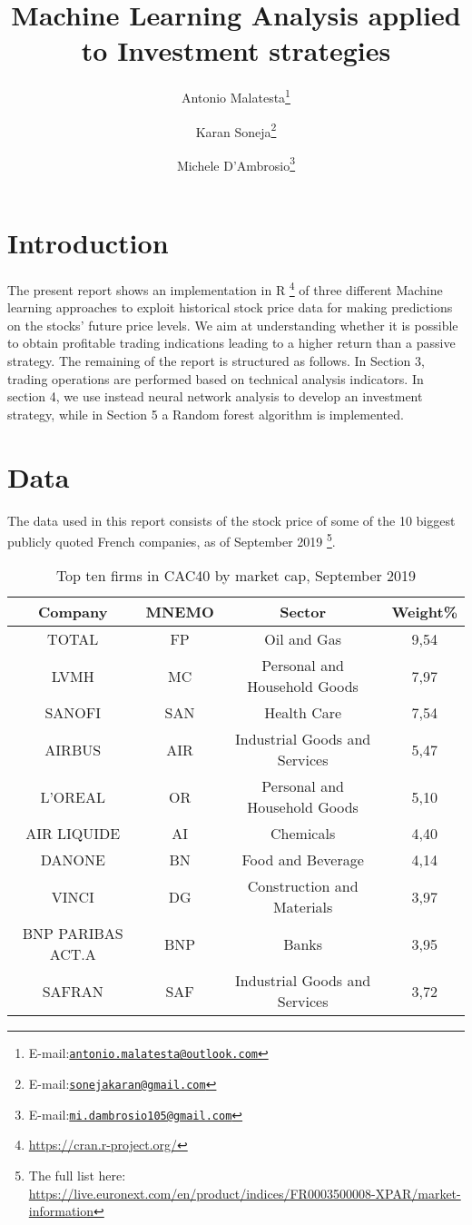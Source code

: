 \documentclass[
  11pt,
]{article}
\title{Machine Learning Analysis applied to Investment strategies}
\subtitle{Université Paris 1 Panthéon-Sorbonne

M2 IRFA Engineering of Financial Mathematics

X5I22919 Data Science Software

Module leader: Prof.~Bertrand K. Hassani}
\author{Antonio Malatesta\footnote{E-mail:\href{mailto:antonio.malatesta@outlook.com}{\nolinkurl{antonio.malatesta@outlook.com}}} \and Karan Soneja\footnote{E-mail:\href{mailto:sonejakaran@gmail.com}{\nolinkurl{sonejakaran@gmail.com}}} \and Michele D'Ambrosio\footnote{E-mail:\href{mailto:mi.dambrosio105@gmail.com}{\nolinkurl{mi.dambrosio105@gmail.com}}}}
\date{}
\begin{document}
\maketitle

{
\setcounter{tocdepth}{2}
\tableofcontents
}
\newpage

\hypertarget{introduction}{%
\section{Introduction}\label{introduction}}

The present report shows an implementation in R \footnote{\url{https://cran.r-project.org/}}
of three different Machine learning approaches to exploit historical
stock price data for making predictions on the stocks' future price
levels. We aim at understanding whether it is possible to obtain
profitable trading indications leading to a higher return than a passive
strategy. The remaining of the report is structured as follows. In
Section 3, trading operations are performed based on technical analysis
indicators. In section 4, we use instead neural network analysis to
develop an investment strategy, while in Section 5 a Random forest
algorithm is implemented.

\hypertarget{data}{%
\section{Data}\label{data}}

The data used in this report consists of the stock price of some of the
10 biggest publicly quoted French companies, as of September 2019
\footnote{The full list here:
  \url{https://live.euronext.com/en/product/indices/FR0003500008-XPAR/market-information}}.

\begin{table}[ht]
\caption{Top ten firms in CAC40 by market cap, September 2019}
\centering
\begin{tabular}{|c|c|c|c|}
  \hline
Company & MNEMO  &  Sector  & Weight\% \\
  \hline
  TOTAL &   FP  & Oil and Gas & 9,54 \\
  LVMH &    MC  & Personal and Household Goods & 7,97 \\
  SANOFI & SAN  & Health Care & 7,54 \\
  AIRBUS & AIR  & Industrial Goods and Services &   5,47 \\
  L'OREAL   & OR  & Personal and Household Goods &  5,10 \\
  AIR LIQUIDE & AI  & Chemicals &   4,40 \\
  DANONE &  BN  & Food and Beverage & 4,14 \\
  VINCI &   DG & Construction and Materials & 3,97 \\
  BNP PARIBAS ACT.A &   BNP  & Banks & 3,95 \\
  SAFRAN & SAF  & Industrial Goods and Services & 3,72 \\
   \hline
  \end{tabular}
\end{table}
\end{document}
